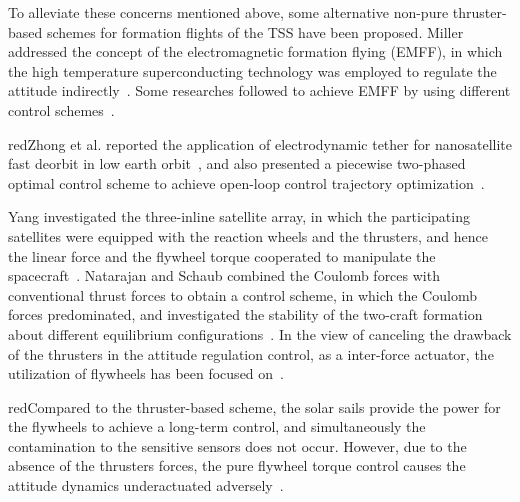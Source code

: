 To alleviate these concerns mentioned above, some alternative non-pure thruster-based schemes for formation flights of the TSS have been proposed. Miller addressed the concept of the electromagnetic formation flying (EMFF), in which the high temperature superconducting technology was employed to regulate the attitude indirectly~\cite{miller2010control}. Some researches followed to achieve EMFF by using different control schemes~\cite{zhang2014adaptive,huang2015lmi}. \begin{color}{red}Zhong et al. reported the application of electrodynamic tether for nanosatellite fast deorbit in low earth orbit~\cite{zhong2013dynamics}, and also presented a piecewise two-phased optimal control scheme to achieve open-loop control trajectory optimization~\cite{zhong2014optimal}.\end{color} Yang investigated the three-inline satellite array, in which the participating satellites were equipped with the reaction wheels and the thrusters, and hence the linear force and the flywheel torque cooperated to manipulate the spacecraft~\cite{yang2015decentralized}. Natarajan and Schaub combined the Coulomb forces with conventional thrust forces to obtain a control scheme, in which the Coulomb forces predominated, and investigated the stability of the two-craft formation about different equilibrium configurations~\cite{natarajan2009hybrid}. In the view of canceling the drawback of the thrusters in the attitude regulation control, as a inter-force actuator, the utilization of flywheels has been focused on~\cite{pizarro2008dynamics}. \begin{color}{red}Compared to the thruster-based scheme, the solar sails provide the power for the flywheels to achieve a long-term control, and simultaneously the contamination to the sensitive sensors does not occur. However, due to the absence of the thrusters forces, the pure flywheel torque control causes the attitude dynamics underactuated adversely~\cite{chung2008propellant1}.\end{color}\par
